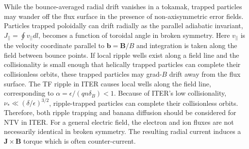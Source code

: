 \documentclass[aip, pop, preprint]{revtex4-1}
\numberwithin{figure}{section}
\numberwithin{equation}{section}
\begin{document}
While  the bounce-averaged radial drift vanishes in a tokamak, trapped particles may wander off the flux surface in the presence of non-axisymmetric error fields. Particles trapped poloidally can drift radially as the parallel adiabatic invariant, $J_{||} = \oint v_{||} dl$, becomes a function of toroidal angle in broken symmetry. Here $v_{||}$ is the velocity coordinate parallel to $\bm{b} = \bm{B}/B$ and integration is taken along the field between bounce points. If local ripple wells exist along a field line and the collisionality is small enough that helically trapped particles can complete their collisionless orbits, these trapped particles may grad-$B$ drift away from the flux surface.\cite{Stringer1972} The TF ripple in ITER causes local wells along the field line, corresponding to $\alpha = \epsilon/(qn\delta_B) < 1$.\cite{Stringer1972} Because of ITER's low collisionality, $\nu_* \ll (\delta/\epsilon)^{3/2}$, ripple-trapped particles can complete their collisionless orbits.\cite{Shaing2003} Therefore, both ripple trapping and banana diffusion should be considered for NTV in ITER. For a general electric field, the electron and ion fluxes are not necessarily identical in broken symmetry. The resulting radial current induces a $\bm{J} \times \bm{B}$ torque which is often counter-current. 
\end{document}

